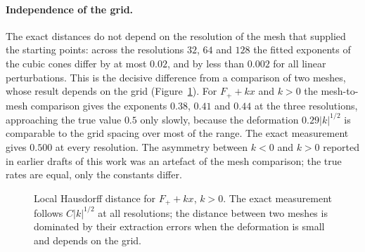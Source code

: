\paragraph{Independence of the grid.} The exact distances do not depend on the
resolution of the mesh that supplied the starting points: across the resolutions
$32$, $64$ and $128$ the fitted exponents of the cubic cones differ by at most
$0.02$, and by less than $0.002$ for all linear perturbations. This is the decisive difference from a comparison of two meshes,
whose result depends on the grid (Figure~\ref{fig:mesh-vs-exact}). For
$F_++kx$ and $k>0$ the mesh-to-mesh comparison gives the exponents $0.38$,
$0.41$ and $0.44$ at the three resolutions, approaching the true value $0.5$
only slowly, because the deformation $0.29|k|^{1/2}$ is comparable to the grid
spacing over most of the range. The exact measurement gives $0.500$ at every
resolution. The asymmetry between $k<0$ and $k>0$ reported in earlier drafts
of this work was an artefact of the mesh comparison; the true rates are equal,
only the constants differ.

\begin{figure}[!h]
\centering
{}
\caption[Exact versus mesh-to-mesh distance]{Local Hausdorff distance for
$F_++kx$, $k>0$. The exact measurement follows $C|k|^{1/2}$ at all resolutions;
the distance between two meshes is dominated by their extraction errors when
the deformation is small and depends on the grid.}
\label{fig:mesh-vs-exact}
\end{figure}

